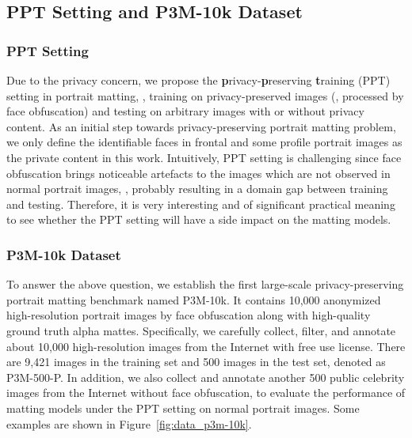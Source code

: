 \documentclass[sigconf]{acmart}
\begin{document}
\subsection{PPT Setting and P3M-10k Dataset}
\subsubsection{PPT Setting}
Due to the privacy concern, we propose the \textbf{p}rivacy-\textbf{p}reserving \textbf{t}raining (PPT) setting in portrait matting, , training on privacy-preserved images (, processed by face obfuscation) and testing on arbitrary images with or without privacy content. As an initial step towards privacy-preserving portrait matting problem, we only define the identifiable faces in frontal and some profile portrait images as the private content in this work. Intuitively, PPT setting is challenging since face obfuscation brings noticeable artefacts to the images which are not observed in normal portrait images, , probably resulting in a domain gap between training and testing. Therefore, it is very interesting and of significant practical meaning to see whether the PPT setting will have a side impact on the matting models.


\subsubsection{P3M-10k Dataset}

To answer the above question, we establish the first large-scale privacy-preserving portrait matting benchmark named P3M-10k. It contains 10,000 anonymized high-resolution portrait images by face obfuscation along with high-quality ground truth alpha mattes. Specifically, we carefully collect, filter, and annotate about 10,000 high-resolution images from the Internet with free use license. There are 9,421 images in the training set and 500 images in the test set, denoted as P3M-500-P. In addition, we also collect and annotate another 500 public celebrity images from the Internet without face obfuscation, to evaluate the performance of matting models under the PPT setting on normal portrait images. Some examples are shown in Figure~\ref{fig:data_p3m-10k}.
\end{document}

